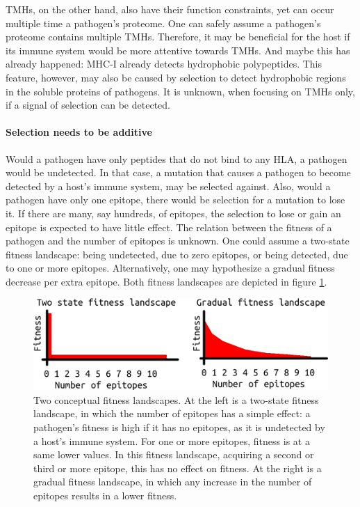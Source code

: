 \documentclass{article}
\begin{document}
TMHs, on the other hand, also have their function constraints, 
yet can occur multiple time a pathogen's proteome.
One can safely assume a pathogen's proteome contains multiple TMHs.
Therefore, it may be beneficial for the host
if its immune system would be more attentive towards TMHs.
And maybe this has already happened: MHC-I already detects hydrophobic
polypeptides. This feature, however, may also be caused by selection
to detect hydrophobic regions in the soluble proteins of pathogens.
It is unknown, when focusing on TMHs only, if a signal of selection
can be detected.

\paragraph{Selection needs to be additive}

Would a pathogen have only peptides that do not bind to
any HLA, a pathogen would be undetected. In that case, a mutation
that causes a pathogen to become detected by a host's immune
system, may be selected against. Also, would a pathogen have only
one epitope, there would be selection for a mutation to lose it.
If there are many, say hundreds, of epitopes, the selection to lose or
gain an epitope is expected to have little effect. The relation
between the fitness of a pathogen and the number of epitopes is unknown.
One could assume a two-state fitness landscape: being
undetected, due to zero epitopes, or being detected, due to one or more
epitopes. Alternatively, one may hypothesize a gradual fitness decrease per
extra epitope. Both fitness landscapes are depicted in 
figure \ref{fig:fitness_landscape}.

\begin{figure}[!htbp]
  \includegraphics[width=\textwidth]{fitness_landscape.png}
  \caption{
    Two conceptual fitness landscapes. At the left is a two-state
    fitness landscape, in which the number of epitopes has a simple
    effect: a pathogen's fitness is high if it has no epitopes,
    as it is undetected by a host's immune system. 
    For one or more epitopes, fitness is at a same lower values. 
    In this fitness landscape, acquiring a second or third or more 
    epitope, this has no effect on fitness.
    At the right is a gradual fitness landscape, in which any increase in
    the number of epitopes results in a lower fitness.
  }
  \label{fig:fitness_landscape}
\end{figure}
\end{document}
